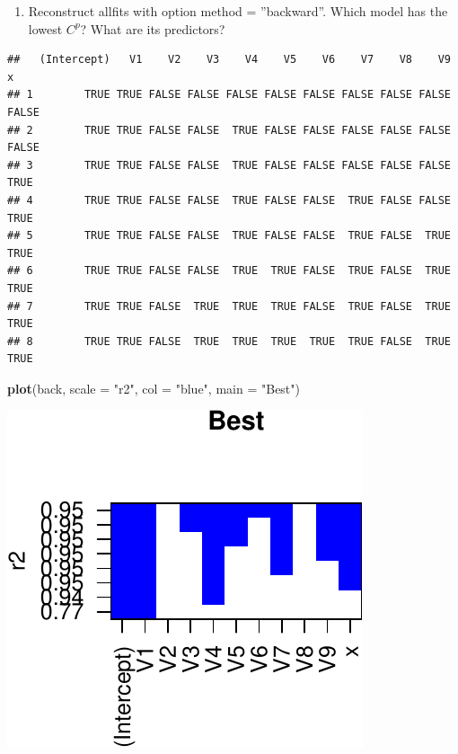 \documentclass[]{article}
\newenvironment{Shaded}{\begin{snugshade}}{\end{snugshade}}
\newcommand{\DataTypeTok}[1]{\textcolor[rgb]{0.13,0.29,0.53}{#1}}
\newcommand{\KeywordTok}[1]{\textcolor[rgb]{0.13,0.29,0.53}{\textbf{#1}}}
\newcommand{\NormalTok}[1]{#1}
\newcommand{\OperatorTok}[1]{\textcolor[rgb]{0.81,0.36,0.00}{\textbf{#1}}}
\newcommand{\StringTok}[1]{\textcolor[rgb]{0.31,0.60,0.02}{#1}}
\providecommand{\tightlist}{%
  \setlength{\itemsep}{0pt}\setlength{\parskip}{0pt}}
\begin{document}
\begin{enumerate}
\def\labelenumi{(\alph{enumi})}
\setcounter{enumi}{3}
\tightlist
\item
  Reconstruct allfits with option method = ''backward''. Which model has
  the lowest \(C^p\)? What are its predictors?
\end{enumerate}

\begin{Shaded}
\end{Shaded}

\begin{verbatim}
##   (Intercept)   V1    V2    V3    V4    V5    V6    V7    V8    V9     x
## 1        TRUE TRUE FALSE FALSE FALSE FALSE FALSE FALSE FALSE FALSE FALSE
## 2        TRUE TRUE FALSE FALSE  TRUE FALSE FALSE FALSE FALSE FALSE FALSE
## 3        TRUE TRUE FALSE FALSE  TRUE FALSE FALSE FALSE FALSE FALSE  TRUE
## 4        TRUE TRUE FALSE FALSE  TRUE FALSE FALSE  TRUE FALSE FALSE  TRUE
## 5        TRUE TRUE FALSE FALSE  TRUE FALSE FALSE  TRUE FALSE  TRUE  TRUE
## 6        TRUE TRUE FALSE FALSE  TRUE  TRUE FALSE  TRUE FALSE  TRUE  TRUE
## 7        TRUE TRUE FALSE  TRUE  TRUE  TRUE FALSE  TRUE FALSE  TRUE  TRUE
## 8        TRUE TRUE FALSE  TRUE  TRUE  TRUE  TRUE  TRUE FALSE  TRUE  TRUE
\end{verbatim}

\begin{Shaded}
\begin{Highlighting}[]
\KeywordTok{plot}\NormalTok{(back, }\DataTypeTok{scale =} \StringTok{"r2"}\NormalTok{, }\DataTypeTok{col =} \StringTok{"blue"}\NormalTok{, }\DataTypeTok{main =} \StringTok{"Best"}\NormalTok{)}
\end{Highlighting}
\end{Shaded}

\begin{center}\includegraphics{sol_A3_files/figure-latex/unnamed-chunk-25-1} \end{center}
\end{document}
